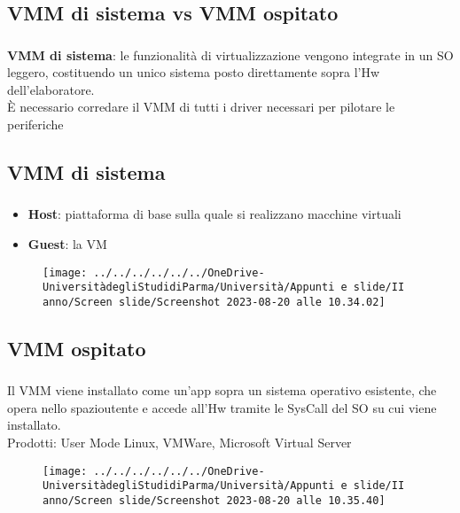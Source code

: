 \documentclass{beamer}
\newenvironment{mainframe}{
	\begin{frame}
		\frametitle{\insertsubsection}
		\framesubtitle{\insertsection}
	}{
	\end{frame}
}
\begin{document}
\subsection{VMM di sistema vs VMM ospitato}
\begin{mainframe}
	\textbf{VMM di sistema}: le funzionalità di virtualizzazione vengono integrate in un SO leggero, costituendo un unico sistema posto direttamente sopra l'Hw dell'elaboratore.\\
	È necessario corredare il VMM di tutti i driver necessari per pilotare le periferiche
\end{mainframe}
\subsection{VMM di sistema}
\begin{mainframe}
	\begin{itemize}
		\item \textbf{Host}: piattaforma di base sulla quale si realizzano macchine virtuali
		\item \textbf{Guest}: la VM
	\end{itemize}
	\begin{figure}
		\centering
		\texttt{[image: ../../../../../../OneDrive-UniversitàdegliStudidiParma/Università/Appunti e slide/II anno/Screen slide/Screenshot 2023-08-20 alle 10.34.02]}
	\end{figure}
\end{mainframe}
\subsection{VMM ospitato}
\begin{mainframe}
	Il VMM viene installato come un'app sopra un sistema operativo esistente, che opera nello spazioutente e accede all'Hw tramite le SysCall del SO su cui viene installato.\\
	Prodotti: User Mode Linux, VMWare, Microsoft Virtual Server
	\begin{figure}
		\centering
		\texttt{[image: ../../../../../../OneDrive-UniversitàdegliStudidiParma/Università/Appunti e slide/II anno/Screen slide/Screenshot 2023-08-20 alle 10.35.40]}
	\end{figure}
\end{mainframe}
\end{document}
